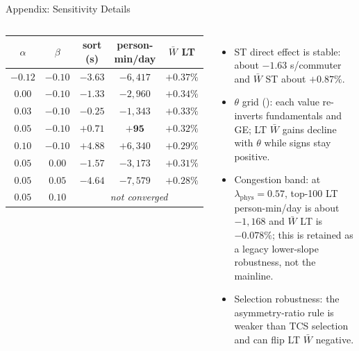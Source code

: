 \documentclass[11pt,aspectratio=169]{beamer}
\newcommand{\app}[1]{\allowbreak\hspace{0.25em}\hyperlink{#1}{\beamergotobutton{details}}}
\newcommand{\navback}[1]{\par\vspace{0.35em}\noindent\hfill\hyperlink{#1}{\beamerreturnbutton{back}}}
\begin{document}
\begin{frame}[label=appsensdetail]{Appendix: Sensitivity Details}
\scriptsize
\begin{columns}[T,onlytextwidth]
\begin{flushright}
\setlength{\tabcolsep}{1.0pt}
\begin{tabular}{ccccc}
\toprule
$\alpha$ & $\beta$ & sort (s) & person-min/day & $\bar W$ LT \\
\midrule
$-0.12$ & $-0.10$ & $-3.63$ & $-6{,}417$ & $+0.37\%$ \\
$0.00$ & $-0.10$ & $-1.33$ & $-2{,}960$ & $+0.34\%$ \\
$0.03$ & $-0.10$ & $-0.25$ & $-1{,}343$ & $+0.33\%$ \\
$\mathbf{0.05}$ & $\mathbf{-0.10}$ & $\mathbf{+0.71}$ & $\mathbf{+95}$ & $\mathbf{+0.32\%}$ \\
$0.10$ & $-0.10$ & $+4.88$ & $+6{,}340$ & $+0.29\%$ \\
$0.05$ & $0.00$ & $-1.57$ & $-3{,}173$ & $+0.31\%$ \\
$0.05$ & $0.05$ & $-4.64$ & $-7{,}579$ & $+0.28\%$ \\
$0.05$ & $0.10$ & \multicolumn{3}{c}{\emph{not converged}} \\
\bottomrule
\end{tabular}
\end{flushright}
\begin{itemize}\footnotesize
  \item ST direct effect is stable: about $-1.63$ s/commuter and $\bar W$ ST about $+0.87\%$.
  \item $\theta$ grid (\app{appsens_theta}): each value re-inverts fundamentals and GE; LT $\bar W$ gains decline with $\theta$ while signs stay positive.
  \item Congestion band: at $\lambda_{\mathrm{phys}}=0.57$, top-100 LT person-min/day is about $-1{,}168$ and $\bar W$ LT is $-0.078\%$; this is retained as a legacy lower-slope robustness, not the mainline.
  \item Selection robustness: the asymmetry-ratio rule is weaker than TCS selection and can flip LT $\bar W$ negative.
\end{itemize}
\end{columns}
\navback{appsens}
\end{frame}
\end{document}
